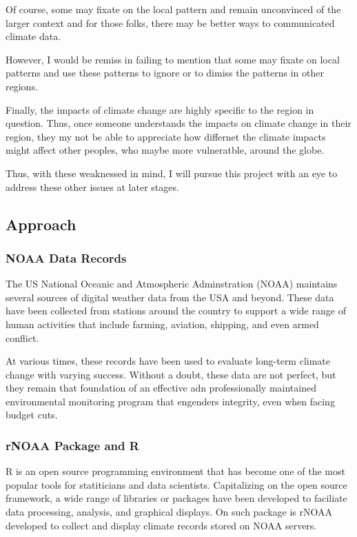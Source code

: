 \documentclass{article}\usepackage[]{graphicx}\usepackage[]{color}
\begin{document}
Of course, some may fixate on the local pattern and remain unconvinced of the larger context and for those folks, there may be better ways to communicated climate data. 

However, I would be remiss in failing to mention that some may fixate on local patterns and use these patterns to ignore or to dimiss the patterns in other regions. 

Finally, the impacts of climate change are highly specific to the region in question. Thus, once someone understands the impacts on climate change in their region, they my not be able to appreciate how differnet the climate impacts might affect other peoples, who maybe more vulneratble, around the globe. 

Thus, with these weaknessed in mind, I will pursue this project with an eye to address these other issues at later stages.

\subsection{Approach}

\subsubsection{NOAA Data Records}

The US National Oceanic and Atmospheric Adminstration (NOAA) maintains several sources of digital weather data from the USA and beyond. These data have been collected from stations around the country to support a wide range of human activities that include farming, aviation, shipping, and even armed conflict. 

At various times, these records have been used to evaluate long-term climate change with varying success. Without a doubt, these data are not perfect, but they remain that foundation of an effective adn professionally maintained environmental monitoring program that engenders integrity, even when facing budget cuts. 


\subsubsection{rNOAA Package and R}

R is an open source programming environment that has become one of the most popular tools for statiticians and data scientists. Capitalizing on the open source framework, a wide range of libraries or packages have been developed to faciliate data processing, analysis, and graphical displays. On such package is rNOAA developed to collect and display climate records stored on NOAA servers.
\end{document}

